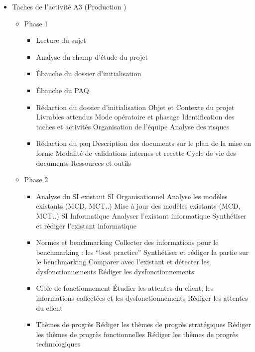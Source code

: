 \begin{itemize}
    \item Taches de l’activité A3 (Production )
    \begin{itemize}
        \item Phase 1
        \begin{itemize}
            \item Lecture du sujet
            \item Analyse du champ d’étude du projet
            \item Ébauche du dossier d’initialisation
            \item Ébauche du PAQ
            \item Rédaction du dossier d’initialisation
                \subitem Objet et Contexte du projet
                \subitem Livrables attendus
                \subitem Mode opératoire et phasage
                \subitem Identification des taches et activités
                \subitem Organisation de l’équipe
                \subitem Analyse des risques
            \item Rédaction du paq
                \subitem Description des documents sur le plan de la mise en forme
                \subitem Modalité de validations internes et recette
                \subitem Cycle de vie des documents
                \subitem Ressources et outils
        \end{itemize}

        \item Phase 2
        \begin{itemize}
            \item Analyse du SI existant
                \subitem SI Organisationnel
                    \subsubitem Analyse les modèles existants (MCD, MCT..)
                    \subsubitem Mise à jour des modèles existants (MCD, MCT..)
                \subitem SI Informatique
                    \subsubitem Analyser l’existant informatique
                    \subsubitem Synthétiser et rédiger l’existant informatique
            \item Normes et benchmarking
                \subitem Collecter des informations pour le benchmarking : les “best practice”
                \subitem Synthétiser et rédiger la partie sur le benchmarking
                \subitem Comparer avec l’existant et détecter les dysfonctionnements
                \subitem Rédiger les dysfonctionnements
            \item Cible de fonctionnement
                \subitem Étudier les attentes du client, les informations collectées et les dysfonctionnements
                \subitem Rédiger les attentes du client
            \item Thèmes de progrès
                \subitem Rédiger les thèmes de progrès stratégiques
                \subitem Rédiger les thèmes de progrès fonctionnelles
                \subitem Rédiger les thèmes de progrès technologiques
        \end{itemize}


\end{itemize}
\end{itemize}
